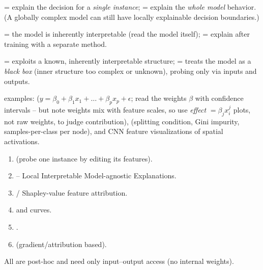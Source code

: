 \begin{keybox}
\begin{description}[leftmargin=1.3cm,style=nextline]
  \item[Scope]  = explain the decision for a \emph{single instance};
     = explain the \emph{whole model} behavior. (A globally complex
    model can still have locally explainable decision boundaries.)
  \item[When]  = the model is inherently interpretable (read the
    model itself);  = explain after training with a separate method.
  \item[Coupling]  = exploits a known, inherently
    interpretable structure;  = treats the model as a
    \emph{black box} (inner structure too complex or unknown), probing only via
    inputs and outputs.
\end{description}
\end{keybox}

 examples: 
($y=\beta_0+\beta_1 x_1+\dots+\beta_p x_p+\epsilon$; read the weights $\beta$
with confidence intervals -- but note weights mix with feature scales, so use
\emph{effect} $=\beta_j x_i^j$ plots, not raw weights, to judge contribution),
 (splitting condition, Gini impurity, samples-per-class per
node), and CNN feature visualizations of spatial activations.

\begin{exambox}
\begin{enumerate}[label=\arabic*.]
  \item {} (probe one instance by editing its features).
  \item {} -- Local Interpretable Model-agnostic Explanations.
  \item {} / Shapley-value feature attribution.
  \item {} and  curves.
  \item {}.
  \item {} (gradient/attribution based).
\end{enumerate}
All are post-hoc and need only input--output access (no internal weights).
\end{exambox}

